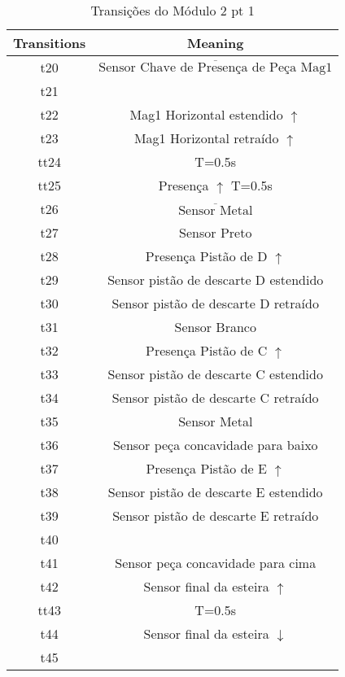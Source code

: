 \begin{table}[htbp]
\caption{Transições do Módulo 2 pt 1}
\centering
\begin{tabular}{c|c}
Transitions & Meaning\\
\hline
t20 & \(\overline{\mbox{Sensor Chave de Presença de Peça Mag1}}\)\\
t21 & \\
t22 & Mag1 Horizontal estendido \(\uparrow\)\\
t23 & Mag1 Horizontal retraído \(\uparrow\)\\
tt24 & T=0.5s\\
tt25 & Presença \(\uparrow\) T=0.5s\\
t26 & \(\overline{\mbox{Sensor Metal}}\)\\
t27 & Sensor Preto\\
t28 & Presença Pistão de D \(\uparrow\)\\
t29 & Sensor pistão de descarte D estendido\\
t30 & Sensor pistão de descarte D retraído\\
t31 & Sensor Branco\\
t32 & Presença Pistão de C \(\uparrow\)\\
t33 & Sensor pistão de descarte C estendido\\
t34 & Sensor pistão de descarte C retraído\\
t35 & Sensor Metal\\
t36 & Sensor peça concavidade para baixo\\
t37 & Presença Pistão de E \(\uparrow\)\\
t38 & Sensor pistão de descarte E estendido\\
t39 & Sensor pistão de descarte E retraído\\
t40 & \\
t41 & Sensor peça concavidade para cima\\
t42 & Sensor final da esteira \(\uparrow\)\\
tt43 & T=0.5s\\
t44 & Sensor final da esteira \(\downarrow\)\\
t45 & \\
\end{tabular}
\end{table}
